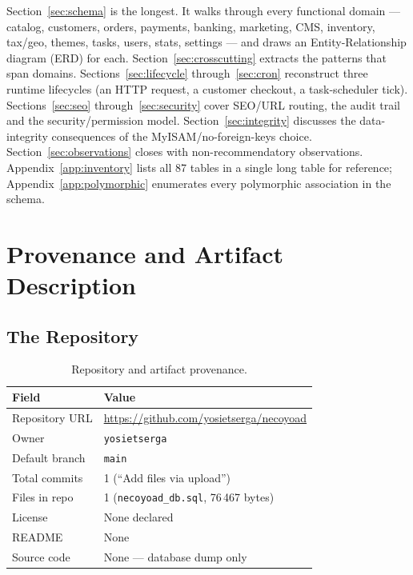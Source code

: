 \documentclass[11pt,a4paper]{article}
\begin{document}
Section~\ref{sec:schema} is the longest. It walks through every functional
domain --- catalog, customers, orders, payments, banking, marketing, CMS,
inventory, tax/geo, themes, tasks, users, stats, settings --- and draws an
Entity-Relationship diagram (ERD) for each. Section~\ref{sec:crosscutting}
extracts the patterns that span domains. Sections~\ref{sec:lifecycle}
through~\ref{sec:cron} reconstruct three runtime lifecycles (an HTTP request,
a customer checkout, a task-scheduler tick). Sections~\ref{sec:seo}
through~\ref{sec:security} cover SEO/URL routing, the audit trail and the
security/permission model. Section~\ref{sec:integrity} discusses the
data-integrity consequences of the MyISAM/no-foreign-keys choice.
Section~\ref{sec:observations} closes with non-recommendatory observations.
Appendix~\ref{app:inventory} lists all 87 tables in a single long table for
reference; Appendix~\ref{app:polymorphic} enumerates every polymorphic
association in the schema.

\section{Provenance and Artifact Description}\label{sec:provenance}

\subsection{The Repository}

\begin{table}[htbp]
\centering
\caption{Repository and artifact provenance.}\label{tab:provenance}
\small
\begin{tabularx}{\columnwidth}{lX}
\toprule
\textbf{Field} & \textbf{Value} \\
\midrule
Repository URL & \url{https://github.com/yosietserga/necoyoad} \\
Owner          & \texttt{yosietserga} \\
Default branch & \texttt{main} \\
Total commits  & 1 (``Add files via upload'') \\
Files in repo  & 1 (\texttt{necoyoad\_db.sql}, 76\,467 bytes) \\
License        & None declared \\
README         & None \\
Source code    & None --- database dump only \\
\bottomrule
\end{tabularx}
\end{table}
\end{document}
